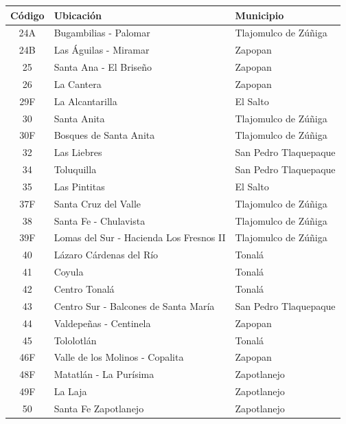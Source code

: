 \documentclass[openany]{book}
\begin{document}
            \begin{table}[H]
            \centering
            \small
            \begin{tabular}{|c|l|l|}
            \hline
            \textbf{Código} & \textbf{Ubicación} & \textbf{Municipio} \\
            \hline
            24A & Bugambilias - Palomar & Tlajomulco de Zúñiga \\
            24B & Las Águilas - Miramar & Zapopan \\
            25 & Santa Ana - El Briseño & Zapopan \\
            26 & La Cantera & Zapopan \\
            29F & La Alcantarilla & El Salto \\
            30 & Santa Anita & Tlajomulco de Zúñiga \\
            30F & Bosques de Santa Anita & Tlajomulco de Zúñiga \\
            32 & Las Liebres & San Pedro Tlaquepaque \\
            34 & Toluquilla & San Pedro Tlaquepaque \\
            35 & Las Pintitas & El Salto \\
            37F & Santa Cruz del Valle & Tlajomulco de Zúñiga \\
            38 & Santa Fe - Chulavista & Tlajomulco de Zúñiga \\
            39F & Lomas del Sur - Hacienda Los Fresnos II & Tlajomulco de Zúñiga \\
            40 & Lázaro Cárdenas del Río & Tonalá \\
            41 & Coyula & Tonalá \\
            42 & Centro Tonalá & Tonalá \\
            43 & Centro Sur - Balcones de Santa María & San Pedro Tlaquepaque \\
            44 & Valdepeñas - Centinela & Zapopan \\
            45 & Tololotlán & Tonalá \\
            46F & Valle de los Molinos - Copalita & Zapopan \\
            48F & Matatlán - La Purísima & Zapotlanejo \\
            49F & La Laja & Zapotlanejo \\
            50 & Santa Fe Zapotlanejo & Zapotlanejo \\
            \hline
            \end{tabular}
            \end{table}
\end{document}
